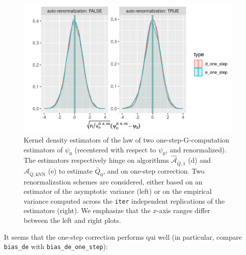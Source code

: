 \documentclass[11pt,openright,twoside]{book}
\newenvironment{Shaded}{\begin{snugshade}}{\end{snugshade}}
\newcommand{\CommentTok}[1]{\textcolor[rgb]{0.56,0.35,0.01}{\textit{#1}}}
\newcommand{\KeywordTok}[1]{\textcolor[rgb]{0.13,0.29,0.53}{\textbf{#1}}}
\newcommand{\NormalTok}[1]{#1}
\newcommand{\OperatorTok}[1]{\textcolor[rgb]{0.81,0.36,0.00}{\textbf{#1}}}
\newcommand{\StringTok}[1]{\textcolor[rgb]{0.31,0.60,0.02}{#1}}
\newcommand{\Algo}{\widehat{\mathcal{A}}}
\newcommand{\Qbar}{\bar{Q}}
\theoremstyle{definition}
\theoremstyle{definition}
\theoremstyle{definition}
\theoremstyle{remark}
\begin{document}
\begin{figure}

{\centering \includegraphics[width=0.7\linewidth]{img/one-step-one-1} 

}

\caption{Kernel density estimators of the law of two one-step-G-computation estimators of \(\psi_{0}\) (recentered with respect to \(\psi_{0}\), and renormalized). The estimators respectively hinge on algorithms \(\Algo_{\Qbar,1}\) (d) and \(\Algo_{\Qbar,\text{kNN}}\) (e) to estimate \(\Qbar_{0}\), and on one-step correction. Two renormalization schemes are considered, either based on an estimator of the asymptotic variance (left) or on the empirical variance computed across the \texttt{iter} independent replications of the estimators (right). We emphasize that the \(x\)-axis ranges differ between the left and right plots.}\label{fig:one-step-one}
\end{figure}

It seems that the one-step correction performs qui well (in particular,
compare \texttt{bias\_de} with \texttt{bias\_de\_one\_step}):

\begin{Shaded}
\end{Shaded}
\end{document}
